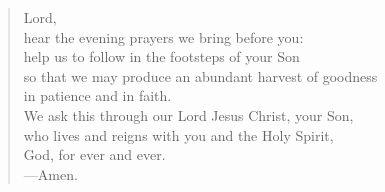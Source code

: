 \prayer

\setlength{\leftmargini}{\prayerleftmargini}

\begin{verse}
Lord,\\
hear the evening prayers we bring before you:\\
help us to follow in the footsteps of your Son\\
so that we may produce an abundant harvest of goodness\\
in patience and in faith.\\
We ask this through our Lord Jesus Christ, your Son,\\
who lives and reigns with you and the Holy Spirit,\\
God, for ever and ever.\\
{\color{red}---\thinspace}Amen.
\end{verse}

\setlength{\leftmargini}{\defleftmargini}